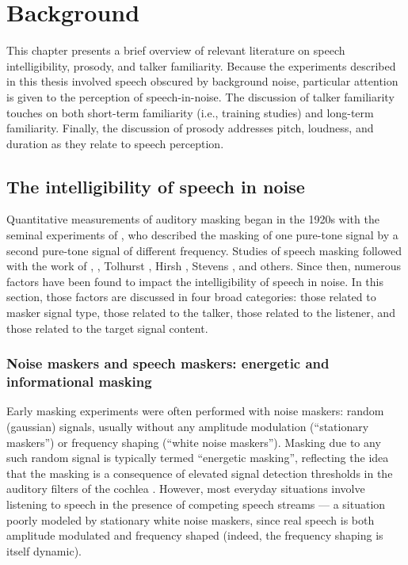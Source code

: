 \chapter{Background}
This chapter presents a brief overview of relevant literature on speech intelligibility, prosody, and talker familiarity.  Because the experiments described in this thesis involved speech obscured by background noise, particular attention is given to the perception of speech-in-noise.  The discussion of talker familiarity touches on both short-term familiarity (i.e., training studies) and long-term familiarity.  Finally, the discussion of prosody addresses pitch, loudness, and duration as they relate to speech perception.

\section{The intelligibility of speech in noise}
Quantitative measurements of auditory masking began in the 1920s with the seminal experiments of \citet{WegelLane1924}, who described the masking of one pure-tone signal by a second pure-tone signal of different frequency.  Studies of speech masking followed with the work of \citet{Miller1947}, \citet{Cherry1953}, Tolhurst \citep{BlackEtAl1953}, Hirsh \citep{HirshEtAl1954}, Stevens \citep{HawkinsStevens1950}, and others.  %
Since then, numerous factors have been found to impact the intelligibility of speech in noise.  In this section, those factors are discussed in four broad categories: those related to masker signal type, those related to the talker, those related to the listener, and those related to the target signal content.

\subsection{Noise maskers and speech maskers: energetic and informational masking}
Early masking experiments \citep[e.g.,][]{HawkinsStevens1950,Tolhurst1957,PollackPickett1958} were often performed with noise maskers: random (gaussian) signals, usually without any amplitude modulation (“stationary maskers”) or frequency shaping (“white noise maskers”).  Masking due to any such random signal is typically termed “energetic masking”, reflecting the idea that the masking is a consequence of elevated signal detection thresholds in the auditory filters of the cochlea \citep{DurlachEtAl2003}.  However, most everyday situations involve listening to speech in the presence of competing speech streams — a situation poorly modeled by stationary white noise maskers, since real speech is both amplitude modulated and frequency shaped (indeed, the frequency shaping is itself dynamic).  

